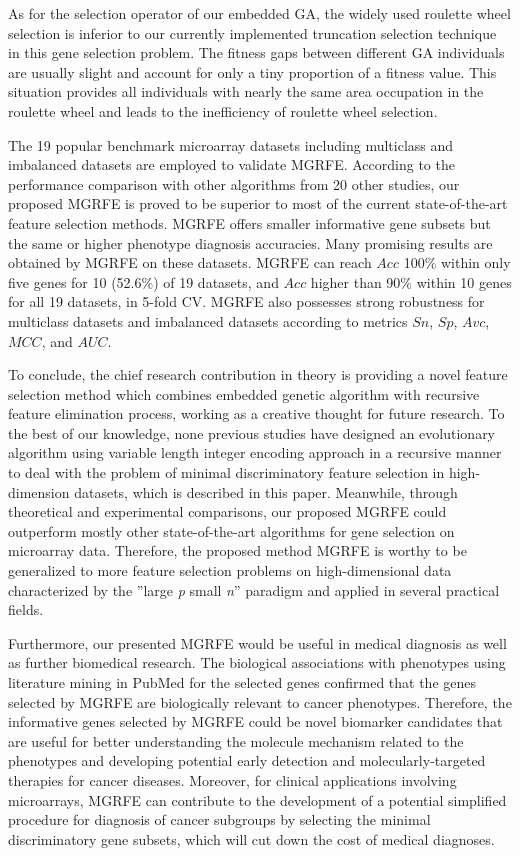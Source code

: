 \documentclass[10pt,journal,compsoc]{IEEEtran}
\begin{document}
	As for the selection operator of our embedded GA, the widely used roulette wheel selection \cite{P37} is inferior to our currently implemented truncation selection technique in this gene selection problem. The fitness gaps between different GA individuals are usually slight and account for only a tiny proportion of a fitness value. This situation provides all individuals with nearly the same area occupation in the roulette wheel and leads to the inefficiency of roulette wheel selection. 
	
	The 19 popular benchmark microarray datasets including multiclass and imbalanced datasets are employed to validate MGRFE. According to the performance comparison with other algorithms from 20 other studies, our proposed MGRFE is proved to be superior to most of the current state-of-the-art feature selection methods. MGRFE offers smaller informative gene subsets but the same or higher phenotype diagnosis accuracies. Many promising results are obtained by MGRFE on these datasets. MGRFE can reach $Acc$ 100\% within only five genes for 10 (52.6\%) of 19 datasets, and $Acc$ higher than 90\% within 10 genes for all 19 datasets, in 5-fold CV. MGRFE also possesses strong robustness for multiclass datasets and imbalanced datasets according to metrics $Sn$, $Sp$, $Avc$, $MCC$, and $AUC$.
	
	To conclude, the chief research contribution in theory is providing a novel feature selection method which combines embedded genetic algorithm with recursive feature elimination process, working as a creative thought for future research. To the best of our knowledge, none previous studies have designed an evolutionary algorithm using variable length integer encoding approach in a recursive manner to deal with the problem of minimal discriminatory feature selection in high-dimension datasets, which is described in this paper. Meanwhile, through theoretical and experimental comparisons, our proposed MGRFE could outperform mostly other state-of-the-art algorithms for gene selection on microarray data. Therefore, the proposed method MGRFE is worthy to be generalized to more feature selection problems on high-dimensional data characterized by the ”large \textit{p} small \textit{n}” paradigm and applied in several practical fields.

	Furthermore, our presented MGRFE would be useful in medical diagnosis as well as further biomedical research. The biological associations with phenotypes using literature mining in PubMed for the selected genes confirmed that the genes selected by MGRFE are biologically relevant to cancer phenotypes. Therefore, the informative genes selected by MGRFE could be novel biomarker candidates that are useful for better understanding the molecule mechanism related to the phenotypes and developing potential early detection and molecularly-targeted therapies for cancer diseases. Moreover, for clinical applications involving microarrays, MGRFE can contribute to the development of a potential simplified procedure for diagnosis of cancer subgroups by selecting the minimal discriminatory gene subsets, which will cut down the cost of medical diagnoses. 
\end{document}
